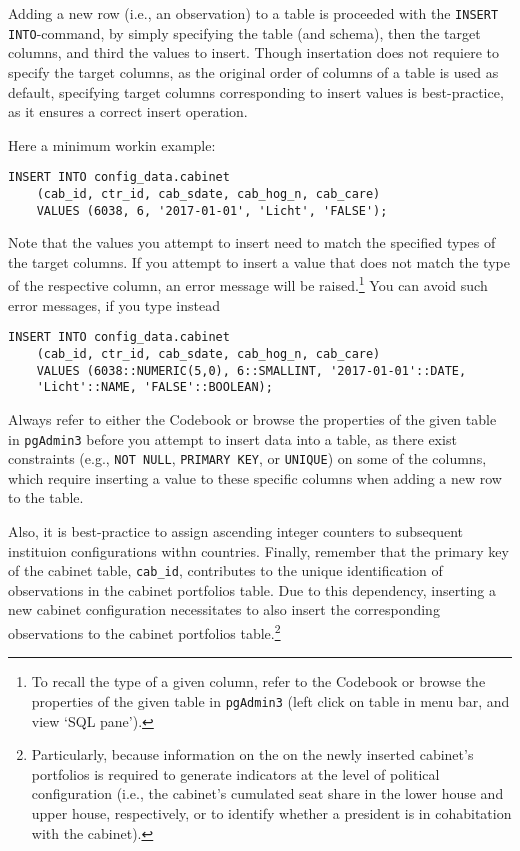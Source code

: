 Adding a new row (i.e., an observation) to a table is proceeded with the \texttt{INSERT INTO}-command, by simply specifying the table (and schema), then the target columns, and third the values to insert.
Though insertation does not requiere to specify the target columns, as the original order of columns of a table is used as default, specifying target columns corresponding to insert values is best-practice, as it ensures a correct insert operation.

Here a minimum workin example:
\begin{lstlisting}[language=postgreSQL]
INSERT INTO config_data.cabinet
	(cab_id, ctr_id, cab_sdate, cab_hog_n, cab_care)
	VALUES (6038, 6, '2017-01-01', 'Licht', 'FALSE');
\end{lstlisting}
Note that the values you attempt to insert need to match the specified types of the target columns. 
If you attempt to insert a value that does not match the type of the respective column, an error message will be raised.\footnote{%
To recall the type of a given column, refer to the Codebook or browse the properties of the given table in \texttt{pgAdmin3} (left click on table in menu bar, and view `SQL pane').}
You can avoid such error messages, if you type instead 
\begin{lstlisting}[language=postgreSQL]
INSERT INTO config_data.cabinet
	(cab_id, ctr_id, cab_sdate, cab_hog_n, cab_care)
	VALUES (6038::NUMERIC(5,0), 6::SMALLINT, '2017-01-01'::DATE, 
    'Licht'::NAME, 'FALSE'::BOOLEAN);
\end{lstlisting}

Always refer to either the Codebook or browse the properties of the given table in \texttt{pgAdmin3} before you attempt to insert data into a table, as there exist constraints (e.g., \texttt{NOT NULL}, \texttt{PRIMARY KEY}, or \texttt{UNIQUE}) on some of the columns, which require inserting a value to these specific columns when adding a new row to the table.

Also, it is best-practice to assign ascending integer counters  to subsequent instituion configurations withn countries.
Finally, remember that the primary key of the cabinet table, \texttt{cab\_id}, contributes to the unique identification of observations in the cabinet portfolios table. 
Due to this dependency, inserting a new cabinet configuration necessitates to also insert the corresponding observations to the cabinet portfolios table.\footnote{%
Particularly, because information on the on the newly inserted cabinet's portfolios is required to generate indicators at the level of political configuration (i.e., the cabinet's cumulated seat share in the lower house and upper house, respectively, or to identify whether a president is in cohabitation with the cabinet).}


